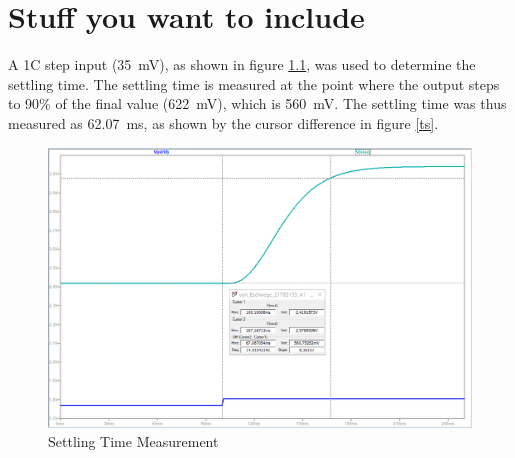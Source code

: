      \chapter{Stuff you want to include}

A 1\degree C step input (\SI{35}{\milli\volt}), as shown in figure \ref{fig:ts}, was used to determine the settling time. The settling time is measured at the point where the output steps to 90\% of the final value (\SI{622}{\milli\volt}), which is \SI{560}{\milli\volt}. The settling time was thus measured as \SI{62.07}{ms}, as shown by the cursor difference in figure \ref{ts}.
\begin{figure}[h]
    \centering
    \includegraphics[width = 1\textwidth]{Figures/ts.png}
    \caption{Settling Time Measurement}
    \label{fig:ts}
\end{figure}